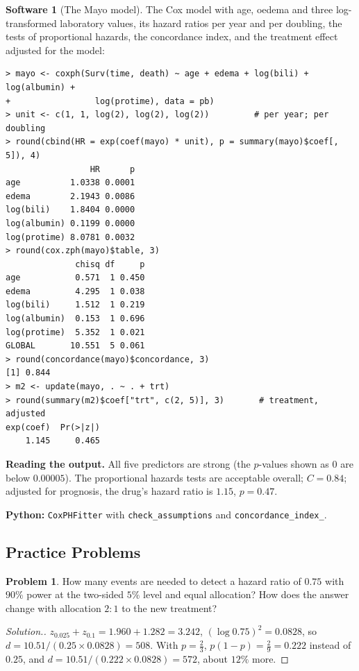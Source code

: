 \documentclass[11pt,a4paper]{article}
\numberwithin{equation}{section}
\theoremstyle{definition}
\newtheorem{software}[thm]{Software}
\newtheorem{problemx}{Problem}[subsection]
\newenvironment{problem}{\begin{problemx}}{\end{problemx}}
\newenvironment{solution}
  {\renewcommand{\qedsymbol}{}\begin{proof}[\textit{Solution}.]}
  {\end{proof}}
\begin{document}
\begin{software}[The Mayo model]
\label{sw:mayo}
The Cox model with age, oedema and three log-transformed laboratory values, its hazard ratios per year and per doubling, the tests of proportional hazards, the concordance index, and the treatment effect adjusted for the model:
{\small\begin{verbatim}
> mayo <- coxph(Surv(time, death) ~ age + edema + log(bili) + log(albumin) +
+                 log(protime), data = pb)
> unit <- c(1, 1, log(2), log(2), log(2))         # per year; per doubling
> round(cbind(HR = exp(coef(mayo) * unit), p = summary(mayo)$coef[, 5]), 4)
                 HR      p
age          1.0338 0.0001
edema        2.1943 0.0086
log(bili)    1.8404 0.0000
log(albumin) 0.1199 0.0000
log(protime) 8.0781 0.0032
> round(cox.zph(mayo)$table, 3)
              chisq df     p
age           0.571  1 0.450
edema         4.295  1 0.038
log(bili)     1.512  1 0.219
log(albumin)  0.153  1 0.696
log(protime)  5.352  1 0.021
GLOBAL       10.551  5 0.061
> round(concordance(mayo)$concordance, 3)
[1] 0.844
> m2 <- update(mayo, . ~ . + trt)
> round(summary(m2)$coef["trt", c(2, 5)], 3)       # treatment, adjusted
exp(coef)  Pr(>|z|) 
    1.145     0.465 
\end{verbatim}}
\textbf{Reading the output.} All five predictors are strong (the $p$-values shown as $0$ are below $0.00005$). The proportional hazards tests are acceptable overall; $C = 0.84$; adjusted for prognosis, the drug's hazard ratio is $1.15$, $p = 0.47$.

\textbf{Python:} \texttt{CoxPHFitter} with \texttt{check\_assumptions} and \texttt{concordance\_index\_}.
\end{software}

\subsection{Practice Problems}

\begin{problem}
How many events are needed to detect a hazard ratio of $0.75$ with $90\%$ power at the two-sided $5\%$ level and equal allocation? How does the answer change with allocation $2:1$ to the new treatment?
\end{problem}

\begin{solution}
$z_{0.025} + z_{0.1} = 1.960 + 1.282 = 3.242$, $(\log 0.75)^2 = 0.0828$, so $d = 10.51/(0.25 \times 0.0828) = 508$. With $p = \frac23$, $p(1 - p) = \frac29 = 0.222$ instead of $0.25$, and $d = 10.51/(0.222 \times 0.0828) = 572$, about $12\%$ more.
\end{solution}
\end{document}
